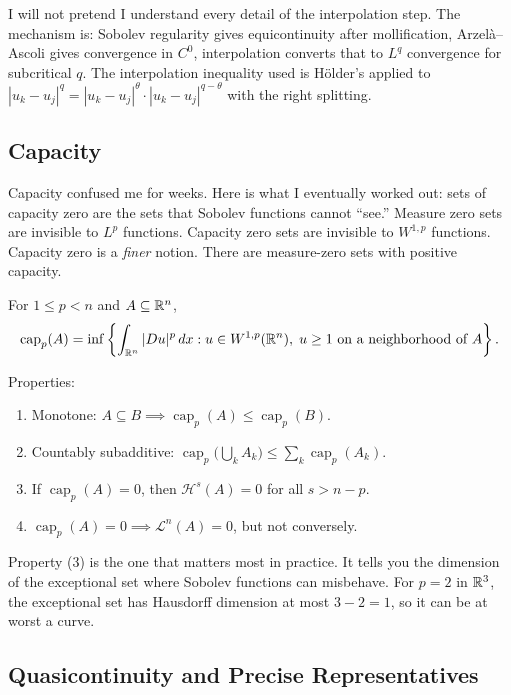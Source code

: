 I will not pretend I understand every detail of the interpolation step. The mechanism is: Sobolev regularity gives equicontinuity after mollification, Arzel\`a--Ascoli gives convergence in $C^0$, interpolation converts that to $L^q$ convergence for subcritical $q$. The interpolation inequality used is H\"older's applied to $|u_k - u_j|^q = |u_k - u_j|^\theta \cdot |u_k - u_j|^{q - \theta}$ with the right splitting.


\subsection{Capacity}

Capacity confused me for weeks. Here is what I eventually worked out: sets of capacity zero are the sets that Sobolev functions cannot ``see.'' Measure zero sets are invisible to $L^p$ functions. Capacity zero sets are invisible to $W^{1,p}$ functions. Capacity zero is a \emph{finer} notion. There are measure-zero sets with positive capacity.

\begin{definition}[$p$-capacity]
\label{def:p-capacity}
For $1 \leq p < n$ and $A \subseteq \mathbb{R}^n$,
\[
    \operatorname{cap}_p(A) = \inf\left\{ \int_{\mathbb{R}^n} |Du|^p \, dx : u \in W^{1,p}(\mathbb{R}^n), \; u \geq 1 \text{ on a neighborhood of } A \right\}.
\]
\end{definition}

Properties:
\begin{enumerate}
    \item Monotone: $A \subseteq B \implies \operatorname{cap}_p(A) \leq \operatorname{cap}_p(B)$.
    \item Countably subadditive: $\operatorname{cap}_p\bigl(\bigcup_k A_k\bigr) \leq \sum_k \operatorname{cap}_p(A_k)$.
    \item If $\operatorname{cap}_p(A) = 0$, then $\mathcal{H}^s(A) = 0$ for all $s > n - p$.
    \item $\operatorname{cap}_p(A) = 0 \implies \mathcal{L}^n(A) = 0$, but not conversely.
\end{enumerate}

Property (3) is the one that matters most in practice. It tells you the dimension of the exceptional set where Sobolev functions can misbehave. For $p = 2$ in $\mathbb{R}^3$, the exceptional set has Hausdorff dimension at most $3 - 2 = 1$, so it can be at worst a curve.


\subsection{Quasicontinuity and Precise Representatives}


